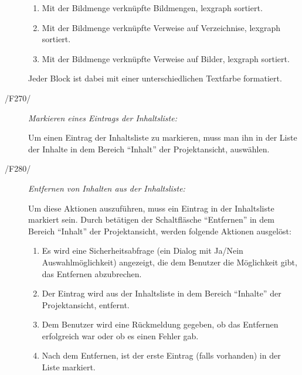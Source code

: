 \begin{description}
			\begin{enumerate}
			
				\item Mit der Bildmenge verknüpfte Bildmengen, \gls{lexgraph} sortiert.
			
				\item Mit der Bildmenge verknüpfte Verweise auf Verzeichnise, \gls{lexgraph} sortiert.
				
				\item Mit der Bildmenge verknüpfte Verweise auf Bilder, \gls{lexgraph} sortiert.
				
			\end{enumerate}
			
			Jeder Block ist dabei mit einer unterschiedlichen Textfarbe formatiert.
		
		\item[/F270/] \textit{Markieren eines Eintrags der Inhaltsliste:}\par Um einen Eintrag der Inhaltsliste zu markieren, muss man ihn in der Liste der Inhalte in dem Bereich "`Inhalt"' der Projektansicht, auswählen.
		
		\item[/F280/] \textit{Entfernen von Inhalten aus der Inhaltsliste:}\par Um diese Aktionen auszuführen, muss ein Eintrag in der Inhaltsliste markiert sein. Durch betätigen der Schaltfläsche "`Entfernen"' in dem Bereich "`Inhalt"' der Projektansicht, werden folgende Aktionen ausgelöst:
			
			\begin{enumerate}
			
				\item Es wird eine Sicherheitsabfrage (ein Dialog mit Ja/Nein Auswahlmöglichkeit) angezeigt, die dem Benutzer die Möglichkeit gibt, das Entfernen abzubrechen.
				
				\item Der Eintrag wird aus der Inhaltsliste in dem Bereich "`Inhalte"' der Projektansicht, entfernt.
				
				\item Dem Benutzer wird eine Rückmeldung gegeben, ob das Entfernen erfolgreich war oder ob es einen Fehler gab.
				
				\item Nach dem Entfernen, ist der erste Eintrag (falls vorhanden) in der Liste markiert.
			
			\end{enumerate}
		

\end{description}
